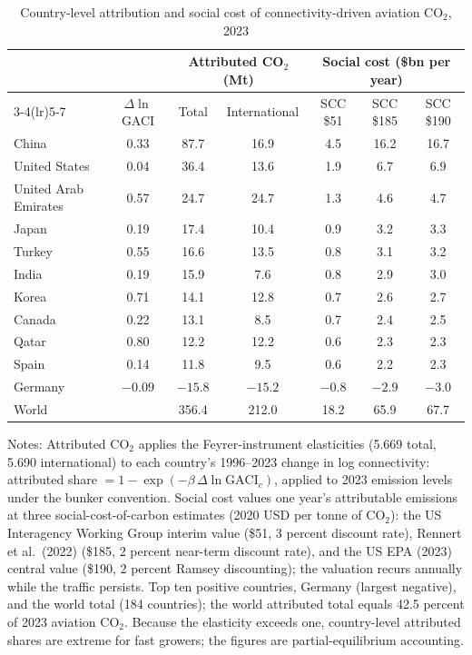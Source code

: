 \documentclass[12pt]{article}
\begin{document}
\begin{table}[htbp]
\centering
\begin{threeparttable}
\caption{Country-level attribution and social cost of connectivity-driven aviation CO$_2$, 2023}
\label{tab:scc}
\footnotesize
\begin{tabular}{lcccccc}
\toprule
 & & \multicolumn{2}{c}{Attributed CO$_2$ (Mt)} & \multicolumn{3}{c}{Social cost (\$bn per year)} \\
\cmidrule(lr){3-4}\cmidrule(lr){5-7}
 & $\Delta \ln$ GACI & Total & International & SCC \$51 & SCC \$185 & SCC \$190 \\
\midrule
China          & 0.33  & 87.7  & 16.9  & 4.5  & 16.2 & 16.7 \\
United States  & 0.04  & 36.4  & 13.6  & 1.9  & 6.7  & 6.9  \\
United Arab Emirates & 0.57 & 24.7 & 24.7 & 1.3 & 4.6 & 4.7 \\
Japan          & 0.19  & 17.4  & 10.4  & 0.9  & 3.2  & 3.3  \\
Turkey         & 0.55  & 16.6  & 13.5  & 0.8  & 3.1  & 3.2  \\
India          & 0.19  & 15.9  & 7.6   & 0.8  & 2.9  & 3.0  \\
Korea          & 0.71  & 14.1  & 12.8  & 0.7  & 2.6  & 2.7  \\
Canada         & 0.22  & 13.1  & 8.5   & 0.7  & 2.4  & 2.5  \\
Qatar          & 0.80  & 12.2  & 12.2  & 0.6  & 2.3  & 2.3  \\
Spain          & 0.14  & 11.8  & 9.5   & 0.6  & 2.2  & 2.3  \\
Germany        & $-0.09$ & $-15.8$ & $-15.2$ & $-0.8$ & $-2.9$ & $-3.0$ \\
\midrule
World          &       & 356.4 & 212.0 & 18.2 & 65.9 & 67.7 \\
\bottomrule
\end{tabular}
\begin{tablenotes}[flushleft]
\footnotesize
\item Notes: Attributed CO$_2$ applies the Feyrer-instrument elasticities (5.669 total, 5.690 international) to each country's 1996--2023 change in log connectivity: attributed share $= 1-\exp(-\beta\,\Delta\ln\mathrm{GACI}_c)$, applied to 2023 emission levels under the bunker convention. Social cost values one year's attributable emissions at three social-cost-of-carbon estimates (2020 USD per tonne of CO$_2$): the US Interagency Working Group interim value (\$51, 3 percent discount rate), Rennert et al.\ (2022) (\$185, 2 percent near-term discount rate), and the US EPA (2023) central value (\$190, 2 percent Ramsey discounting); the valuation recurs annually while the traffic persists. Top ten positive countries, Germany (largest negative), and the world total (184 countries); the world attributed total equals 42.5 percent of 2023 aviation CO$_2$. Because the elasticity exceeds one, country-level attributed shares are extreme for fast growers; the figures are partial-equilibrium accounting.
\end{tablenotes}
\end{threeparttable}
\end{table}
\end{document}
